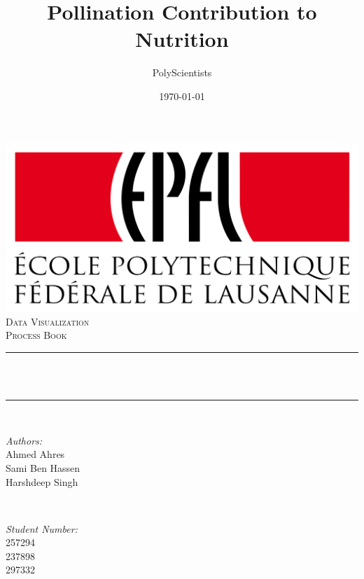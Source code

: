 \documentclass[12pt]{article}
\title{Pollination Contribution to Nutrition}
\author{PolyScientists}
\date{\today}
\makeatletter
\let\thetitle\@title
\let\thedate\@date
\makeatother
\begin{document}

\begin{titlepage}
	\centering
    \vspace*{0.5 cm}
    \includegraphics[scale = 0.11]{epfl_logo.png}\\[0.1 cm]	%
    \vspace*{0.8 cm}
	\textsc{\Large Data Visualization}\\[0.5 cm]				%
	\textsc{\large Process Book}\\[0.5 cm]				%
	\rule{\linewidth}{0.2 mm} \\[0.4 cm]
	{ \huge \bfseries \thetitle}\\
	\rule{\linewidth}{0.2 mm} \\[1.5 cm]
	
	\begin{minipage}{0.4\textwidth}
		\begin{flushleft} \large
			\emph{Authors:}\\
			Ahmed Ahres\\
			Sami Ben Hassen\\
			Harshdeep Singh\\
			\end{flushleft}
			\end{minipage}~
			\begin{minipage}{0.4\textwidth}
			\begin{flushright} \large
			\emph{Student Number:} \\
		    257294\\
		    237898\\
		    297332\\
		\end{flushright}
	\end{minipage}\\[2 cm]
	
	{\large \thedate}\\[2 cm]
 
	\vfill
	
\end{titlepage}
\end{document}
